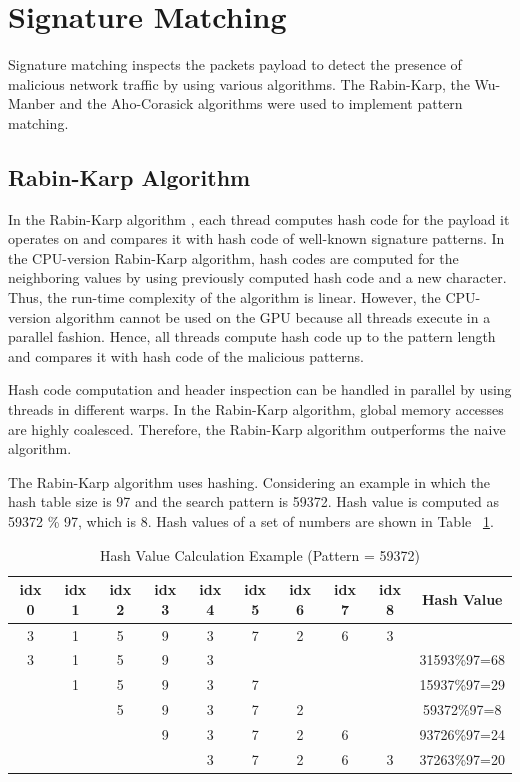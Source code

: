\section{Signature Matching}
Signature matching inspects the packets payload to detect the presence of malicious network traffic by using various algorithms. The Rabin-Karp, the Wu-Manber and the Aho-Corasick algorithms were used to implement pattern matching.

\subsection{Rabin-Karp Algorithm}
In the Rabin-Karp algorithm \cite{bib19}, each thread computes hash code for the payload it operates on and compares it with hash code of well-known signature patterns. In the CPU-version Rabin-Karp algorithm, hash codes are computed for the neighboring values by using previously computed hash code and a new character. Thus, the run-time complexity of the algorithm is linear. However, the CPU-version algorithm cannot be used on the GPU because all threads execute in a parallel fashion. Hence, all threads compute hash code up to the pattern length and compares it with hash code of the malicious patterns. 

Hash code computation and header inspection can be handled in parallel by using threads in different warps. In the Rabin-Karp algorithm, global memory accesses are highly coalesced. Therefore, the Rabin-Karp algorithm outperforms the naive algorithm.

The Rabin-Karp algorithm uses hashing. Considering an example in which the hash table size is 97 and the search pattern is 59372. Hash value is computed as 59372 \% 97, which is 8. Hash values of a set of numbers are shown in Table ~\ref{tab:hashvalue}.

\begin {table}[H]
\caption {Hash Value Calculation Example (Pattern = 59372)} \label{tab:hashvalue}
\begin{tabular}{|c|c|c|c|c|c|c|c|c|c|}
	\midrule
	idx 0 & idx 1 & idx 2 & idx 3 & idx 4 & idx 5 & idx 6 & idx 7 & idx 8 & Hash Value\\
	\midrule
	3 & 1 & 5 & 9 & 3 & 7 & 2 & 6 & 3 &\\
	\midrule
	3 & 1 & 5 & 9 & 3 & & & & & 31593\%97=68 \\
	\midrule
	& 1 & 5 & 9 & 3 & 7 & & & & 15937\%97=29\\
	\midrule
	&   & 5 & 9 & 3 & 7 & 2 & & & 59372\%97=8 \\
	\midrule
	&   &   & 9 & 3 & 7 & 2 & 6 & & 93726\%97=24 \\
	\midrule
	&   &   &   & 3 & 7 & 2 & 6 & 3 & 37263\%97=20 \\
	\midrule
\end{tabular}
\end {table}
\squeezeup

